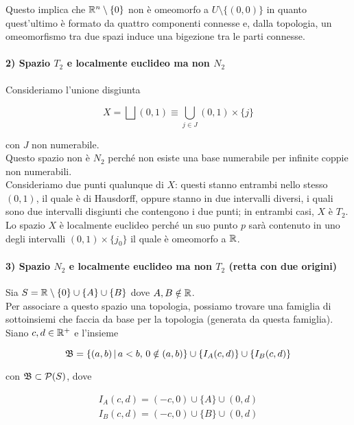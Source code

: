 Questo implica che $ \mathbb{R}^{n} \setminus \{0\} $ non è omeomorfo a $ U \setminus \{(0,0)\} $ in quanto quest'ultimo è formato da quattro componenti connesse e, dalla topologia, un omeomorfismo tra due spazi induce una bigezione tra le parti connesse.

\paragraph{2) Spazio $ T_{2} $ e localmente euclideo ma non $ N_{2} $}

Consideriamo l'unione disgiunta

\begin{equation}
	X = \bigsqcup (0,1) \equiv \bigcup_{j \in J} (0,1) \times \{j\}
\end{equation}

con $ J $ non numerabile.\\
Questo spazio non è $ N_{2} $ perché non esiste una base numerabile per infinite coppie non numerabili.\\
Consideriamo due punti qualunque di $ X $: questi stanno entrambi nello stesso $ (0,1) $, il quale è di Hausdorff, oppure stanno in due intervalli diversi, i quali sono due intervalli disgiunti che contengono i due punti; in entrambi casi, $ X $ è $ T_{2} $.\\
Lo spazio $ X $ è localmente euclideo perché un suo punto $ p $ sarà contenuto in uno degli intervalli $ (0,1) \times \{j_{0}\} $ il quale è omeomorfo a $ \mathbb{R} $.

\paragraph{3) Spazio $ N_{2} $ e localmente euclideo ma non $ T_{2} $ (retta con due origini)}

Sia $ S = \mathbb{R} \setminus \{0\} \cup \{A\} \cup \{B\} $ dove $ A,B \notin \mathbb{R} $.\\ 
Per associare a questo spazio una topologia, possiamo trovare una famiglia di sottoinsiemi che faccia da base per la topologia (generata da questa famiglia). Siano $ c,d \in \mathbb{R}^{+} $ e l'insieme

\begin{equation}
	\mathfrak{B} = \left\{ (a,b) \, \middle| \, a<b, \, 0 \notin (a,b) \right\} \cup \left\{ I_{A}(c,d) \right\} \cup \left\{ I_{B}(c,d) \right\}
\end{equation}

con $ \mathfrak{B} \subset \mathcal{P}(S) $, dove

\begin{gather}
	I_{A}(c,d) = (-c,0) \cup \{A\} \cup (0,d)\\
	I_{B}(c,d) = (-c,0) \cup \{B\} \cup (0,d)
\end{gather}

